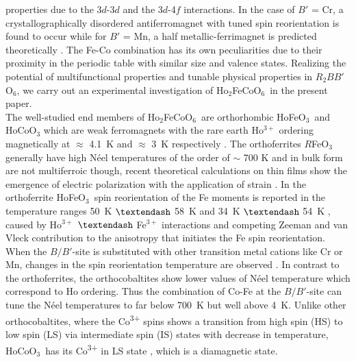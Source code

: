 \documentclass[12pt,twocolumns]{iopart}
\newcommand{\HFCO}{Ho$_2$FeCoO$_6$}
\newcommand{\HFO}{HoFeO$_{3}$}
\newcommand{\HCO}{HoCoO$_{3}$}
\begin{document}
properties due to the 3$d$-3$d$ and the 3$d$-4$f$ interactions. 
In the case of $B'$ = Cr, a crystallographically disordered antiferromagnet 
with tuned spin reorientation is found to occur \cite{kotnana2015band} while for 
$B'$ = Mn, a half metallic-ferrimagnet is predicted theoretically \cite{zhang2010first}. 
The Fe-Co combination has its own peculiarities due to their
proximity in the periodic table with similar size and valence states. 
Realizing the potential of multifunctional properties and tunable 
physical properties in $R_2BB'$O$_6$, we carry out an experimental 
investigation of \HFCO\ in the present paper.
\\
The well-studied end members of \HFCO\ are
orthorhombic \HFO\ and \HCO \cite{shao2011single,hcoorthostrain}
which are weak ferromagnets with the rare earth Ho$^{3+}$
ordering magnetically at $\approx$ 4.1~K and 
$\approx$ 3~K respectively \cite{munoz2012magnetic,shao2011single}.
The orthoferrites $R$FeO$_3$ generally have high N\'{e}el
temperatures of the order of $\sim$ 700 K
\cite{marezio1970crystal,eibschutz1967mossbauer}
and in bulk form are not multiferroic though,
recent theoretical calculations on thin films show the emergence
of electric polarization with the application of
strain \cite{zhao2013effect}.
In the orthoferrite \HFO\, spin reorientation of the Fe
moments is reported in the temperature ranges 
50~K $\textendash$ 58~K \cite{shao2011single} and
34~K $\textendash$ 54~K \cite{HFO}, 
caused by Ho$^{3+}$ $\textendash$ Fe$^{3+}$ interactions
and competing Zeeman and van Vleck contribution to the 
anisotropy that initiates the Fe spin reorientation.
When the $B/B'$-site is substituted with other transition
metal cations like Cr or Mn, changes in the spin 
reorientation temperature are observed
\cite{HFCryuan2014tailoring,kotnana2016enhanced}.
In contrast to the orthoferrites, the orthocobaltites 
show lower values of N\'{e}el temperature which correspond to 
Ho ordering. Thus the combination of Co-Fe at the $B/B'$-site can tune the 
N\'{e}el temperatures to far below 700~K but well above 4~K. 
Unlike other orthocobaltites, where the Co\textsuperscript{3+} spins shows 
a transition from high spin (HS) to low spin (LS) via intermediate spin (IS) 
states with decrease in temperature, \HCO\ has its Co\textsuperscript{3+} in LS 
state \cite{munoz2012magnetic}, which is a diamagnetic state.

\end{document}
